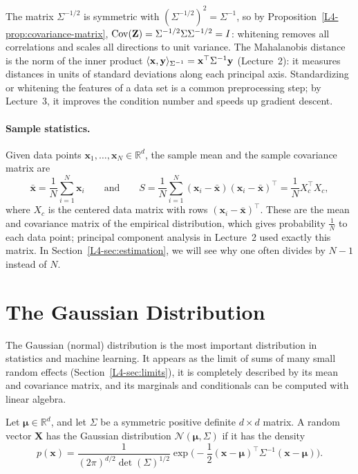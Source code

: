 The matrix $\Sigma^{-1/2}$ is symmetric with $(\Sigma^{-1/2})^2 = \Sigma^{-1}$, so by Proposition~\ref{L4-prop:covariance-matrix}, $\operatorname{Cov}(\mathbf{Z}) = \Sigma^{-1/2}\Sigma\Sigma^{-1/2} = I$: whitening removes all correlations and scales all directions to unit variance. The Mahalanobis distance is the norm of the inner product $\langle \mathbf{x}, \mathbf{y} \rangle_{\Sigma^{-1}} = \mathbf{x}^\top\Sigma^{-1}\mathbf{y}$ (Lecture~2): it measures distances in units of standard deviations along each principal axis. Standardizing or whitening the features of a data set is a common preprocessing step; by Lecture~3, it improves the condition number and speeds up gradient descent.

\paragraph{Sample statistics.} Given data points $\mathbf{x}_1, \ldots, \mathbf{x}_N \in \mathbb{R}^d$, the sample mean and the sample covariance matrix are
\[\bar{\mathbf{x}} = \frac{1}{N}\sum_{i=1}^N \mathbf{x}_i \qquad \text{and} \qquad S = \frac{1}{N}\sum_{i=1}^N (\mathbf{x}_i - \bar{\mathbf{x}})(\mathbf{x}_i - \bar{\mathbf{x}})^\top = \frac{1}{N}X_c^\top X_c,\]
where $X_c$ is the centered data matrix with rows $(\mathbf{x}_i - \bar{\mathbf{x}})^\top$. These are the mean and covariance matrix of the empirical distribution, which gives probability $\frac{1}{N}$ to each data point; principal component analysis in Lecture~2 used exactly this matrix. In Section~\ref{L4-sec:estimation}, we will see why one often divides by $N - 1$ instead of $N$.

\section{The Gaussian Distribution}\label{L4-sec:gaussian}

The Gaussian (normal) distribution is the most important distribution in statistics and machine learning. It appears as the limit of sums of many small random effects (Section~\ref{L4-sec:limits}), it is completely described by its mean and covariance matrix, and its marginals and conditionals can be computed with linear algebra.

\begin{definition}\label{L4-def:gaussian}
    Let $\boldsymbol{\mu} \in \mathbb{R}^d$, and let $\Sigma$ be a symmetric positive definite $d \times d$ matrix. A random vector $\mathbf{X}$ has the Gaussian distribution $\mathcal{N}(\boldsymbol{\mu}, \Sigma)$ if it has the density
    \[p(\mathbf{x}) = \frac{1}{(2\pi)^{d/2}\det(\Sigma)^{1/2}}\exp\Big(-\frac{1}{2}(\mathbf{x} - \boldsymbol{\mu})^\top\Sigma^{-1}(\mathbf{x} - \boldsymbol{\mu})\Big).\]
\end{definition}

